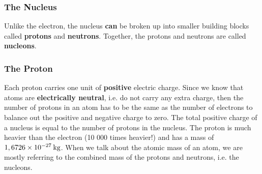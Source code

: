            \subsubsection{ The Nucleus}
            \nopagebreak
        \label{m38745*id255305}Unlike the electron, the nucleus \textbf{can} be broken up into smaller building
blocks called \textbf{protons} and \textbf{neutrons}. Together, the protons and
neutrons are called \textbf{nucleons}.\par 
        \label{m38745*uid12}
            \subsubsection{ The Proton}
            \nopagebreak
          \label{m38745*id255338}Each proton carries one unit of \textbf{positive} electric charge.
Since we know that atoms are
\textbf{electrically neutral}, i.e. do not carry any extra charge, then the number
of protons in an atom has to be the same as the number of electrons to balance
out the positive and negative charge to zero. The total positive charge of a
nucleus is equal to the number of protons in the nucleus. The proton is much heavier
than the electron (10 000 times heavier!) and has a mass of $1,6726\ensuremath{\times}{10}^{-27}\phantom{\rule{2pt}{0ex}}\mathrm{kg}$. When we talk about the atomic mass of an atom, we are mostly referring to the combined mass of the protons and neutrons, i.e. the nucleons.\par 
        \label{m38745*uid13}
